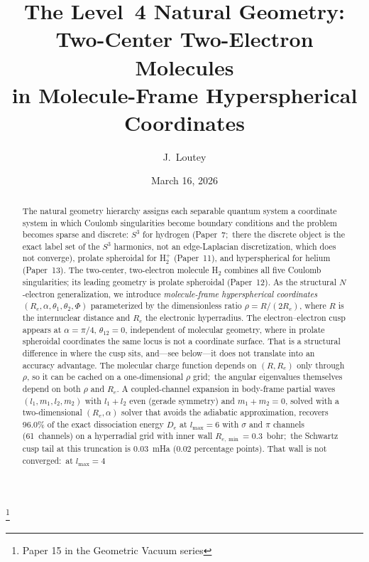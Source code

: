 \documentclass[aps,pra,twocolumn,superscriptaddress,longbibliography]{revtex4-2}
\begin{document}
\title{The Level~4 Natural Geometry:\\
Two-Center Two-Electron Molecules\\
in Molecule-Frame Hyperspherical Coordinates}
\thanks{Paper 15 in the Geometric Vacuum series}

\author{J.~Loutey}

\date{March 16, 2026}

\begin{abstract}
The natural geometry hierarchy assigns each separable quantum system
a coordinate system in which Coulomb singularities become boundary
conditions and the problem becomes sparse and discrete:
$S^3$ for hydrogen (Paper~7;\ there the discrete object is the exact
label set of the $S^3$ harmonics, not an edge-Laplacian discretization,
which does not converge), prolate spheroidal for H$_2^+$ (Paper~11),
and hyperspherical for helium (Paper~13).
The two-center, two-electron molecule H$_2$ combines all five Coulomb
singularities; its leading geometry is prolate spheroidal (Paper~12).
As the structural $N$-electron generalization, we introduce
\emph{molecule-frame hyperspherical coordinates}
$(R_e,\alpha,\theta_1,\theta_2,\Phi)$ parameterized by the
dimensionless ratio $\rho = R/(2R_e)$, where $R$ is the internuclear
distance and $R_e$ the electronic hyperradius.
The electron--electron cusp appears at $\alpha=\pi/4$, $\theta_{12}=0$,
independent of molecular geometry, where in prolate spheroidal
coordinates the same locus is not a coordinate surface.  That is a
structural difference in where the cusp sits, and---see
below---it does not translate into an accuracy advantage.
The molecular charge function depends on $(R,R_e)$ only through $\rho$,
so it can be cached on a one-dimensional $\rho$ grid;\ the angular
eigenvalues themselves depend on both $\rho$ and $R_e$.
A coupled-channel expansion in body-frame partial waves
$(l_1,m_1,l_2,m_2)$ with $l_1+l_2$ even (gerade symmetry) and
$m_1+m_2=0$, solved with a two-dimensional
$(R_e,\alpha)$ solver that avoids the adiabatic approximation,
recovers 96.0\% of the exact dissociation energy $D_e$ at
$l_{\max}=6$ with $\sigma$ and $\pi$ channels (61~channels) on a
hyperradial grid with inner wall $R_{e,\min} = 0.3$~bohr;\ the
Schwartz cusp tail at this truncation is $0.03$~mHa ($0.02$
percentage points).  That wall is not converged:\ at $l_{\max}=4$

\end{abstract}
\end{document}
